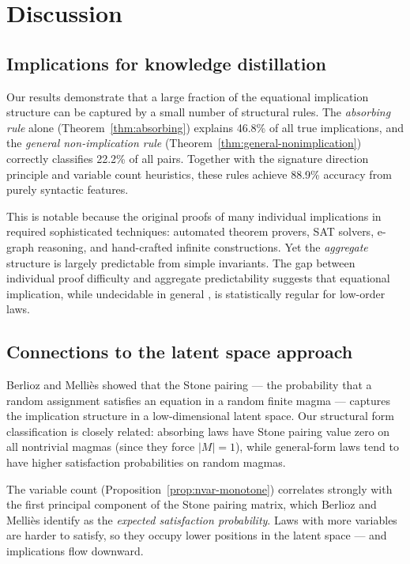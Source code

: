 \section{Discussion}\label{sec:discussion}

\subsection{Implications for knowledge distillation}

Our results demonstrate that a large fraction of the equational implication
structure can be captured by a small number of structural rules.  The
\emph{absorbing rule} alone (Theorem~\ref{thm:absorbing}) explains 46.8\% of
all true implications, and the \emph{general non-implication rule}
(Theorem~\ref{thm:general-nonimplication}) correctly classifies 22.2\% of all
pairs.  Together with the signature direction principle and variable count
heuristics, these rules achieve 88.9\% accuracy from purely syntactic features.

This is notable because the original proofs of many individual implications
in \cite{ETP2025} required sophisticated techniques: automated theorem provers,
SAT solvers, e-graph reasoning, and hand-crafted infinite constructions.  Yet
the \emph{aggregate} structure is largely predictable from simple invariants.
The gap between individual proof difficulty and aggregate predictability
suggests that equational implication, while undecidable in general
\cite{McNulty1976}, is statistically regular for low-order laws.

\subsection{Connections to the latent space approach}

Berlioz and Melli\`{e}s \cite{BM2026} showed that the Stone pairing --- the
probability that a random assignment satisfies an equation in a random finite
magma --- captures the implication structure in a low-dimensional latent space.
Our structural form classification is closely related: absorbing laws have
Stone pairing value zero on all nontrivial magmas (since they force $|M| = 1$),
while general-form laws tend to have higher satisfaction probabilities on random
magmas.

The variable count (Proposition~\ref{prop:nvar-monotone}) correlates strongly
with the first principal component of the Stone pairing matrix, which Berlioz
and Melli\`{e}s identify as the \emph{expected satisfaction probability}.
Laws with more variables are harder to satisfy, so they occupy lower positions
in the latent space --- and implications flow downward.

